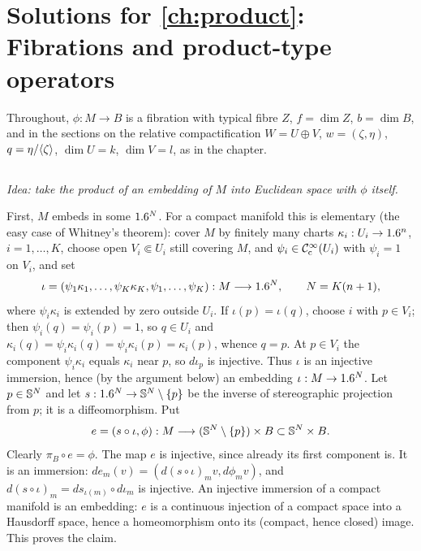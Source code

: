 \providecommand{\RelC}[2]{{}^{#1}\overline{#2}}
\providecommand{\Psipt}[1]{\Psi^{#1}_{\phi\text{-}\mathrm{pt}}}
\providecommand{\Dfm}{\operatorname{Dfm}}
\providecommand{\fib}{\mathrm{fib}}
\providecommand{\Sigmapt}[1]{\Sigma^{#1}_{\phi}}

\section{Solutions for \cref{ch:product}: Fibrations and product-type operators}\label{solutions:ch:product}

Throughout, $\phi:M\to B$ is a fibration with typical fibre $Z$, $f=\dim Z$,
$b=\dim B$, and in the sections on the relative compactification $W=U\oplus V$,
$w=(\zeta,\eta)$, $q=\eta/\langle \zeta\rangle$, $\dim U=k$, $\dim V=l$, as in the chapter.

\subsection*{}
\emph{Idea: take the product of an embedding of $M$ into Euclidean space with
$\phi$ itself.}

First, $M$ embeds in some $1.6^{N}$. For a compact manifold this is elementary (the
easy case of Whitney's theorem): cover $M$ by finitely many charts
$\kappa_i:U_i\to1.6^n$, $i=1,\dots,K$, choose open $V_i\Subset U_i$ still covering
$M$, and $\psi_i\in\mathcal{C}^\infty_{\mathrm{c}}(U_i)$ with $\psi_i=1$ on $V_i$, and set
\begin{equation*}
\iota=(\psi_1\kappa_1,\dots,\psi_K\kappa_K,\psi_1,\dots,\psi_K):M\longrightarrow
1.6^{N},\qquad N=K(n+1),
\end{equation*}
where $\psi_i\kappa_i$ is extended by zero outside $U_i$. If $\iota(p)=\iota(q)$,
choose $i$ with $p\in V_i$; then $\psi_i(q)=\psi_i(p)=1$, so $q\in U_i$ and
$\kappa_i(q)=\psi_i\kappa_i(q)=\psi_i\kappa_i(p)=\kappa_i(p)$, whence $q=p$. At
$p\in V_i$ the component $\psi_i\kappa_i$ equals $\kappa_i$ near $p$, so
$d\iota_p$ is injective. Thus $\iota$ is an injective immersion, hence (by the
argument below) an embedding $\iota:M\to1.6^N$. Let $p\in\mathbb{S}^N$ and let
$s:1.6^N\to\mathbb{S}^N\setminus\{p\}$ be the inverse of stereographic projection from
$p$; it is a diffeomorphism. Put
\begin{equation*}
e=(s\circ\iota,\phi):M\longrightarrow(\mathbb{S}^N\setminus\{p\})\times B
\subset\mathbb{S}^N\times B .
\end{equation*}
Clearly $\pi_B\circ e=\phi$. The map $e$ is injective, since already its first
component is. It is an immersion: $de_m(v)=(d(s\circ\iota)_m v,d\phi_m v)$, and
$d(s\circ\iota)_m=ds_{\iota(m)}\circ d\iota_m$ is injective. An injective
immersion of a compact manifold is an embedding: $e$ is a continuous injection of
a compact space into a Hausdorff space, hence a homeomorphism onto its (compact,
hence closed) image. This proves the claim.

